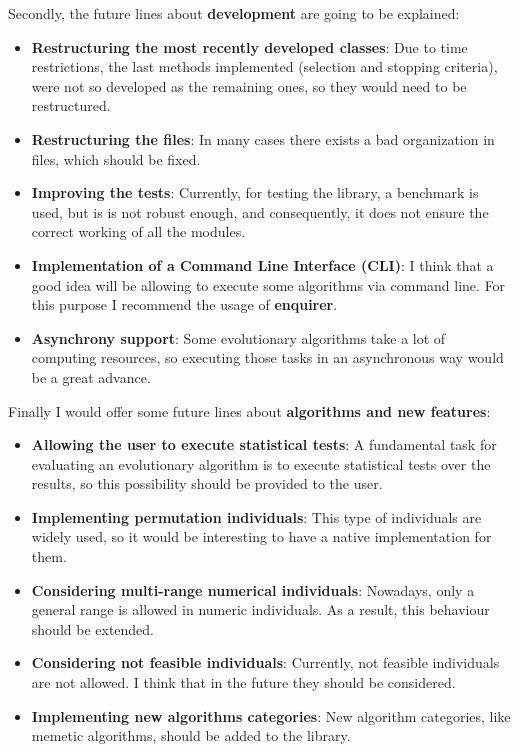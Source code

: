 Secondly, the future lines about \textbf{development} are going to be explained:

\begin{itemize}
    \item \textbf{Restructuring the most recently developed classes}: Due to time restrictions, the last methods implemented (selection and stopping criteria), were not so developed as the remaining ones, so they would need to be restructured.
    \item \textbf{Restructuring the files}: In many cases there exists a bad organization in files, which should be fixed.
    \item \textbf{Improving the tests}: Currently, for testing the library, a benchmark is used, but is is not robust enough, and consequently, it does not ensure the correct working of all the modules.
    \item \textbf{Implementation of a Command Line Interface (CLI)}: I think that a good idea will be allowing to execute some algorithms via command line. For this purpose I recommend the usage of \textbf{enquirer}.
    \item \textbf{Asynchrony support}: Some evolutionary algorithms take a lot of computing resources, so executing those tasks in an asynchronous way would be a great advance.
\end{itemize}

Finally I would offer some future lines about \textbf{algorithms and new features}:

\begin{itemize}
    \item \textbf{Allowing the user to execute statistical tests}: A fundamental task for evaluating an evolutionary algorithm is to execute statistical tests over the results, so this possibility should be provided to the user.
    \item \textbf{Implementing permutation individuals}: This type of individuals are widely used, so it would be interesting to have a native implementation for them.
    \item \textbf{Considering multi-range numerical individuals}: Nowadays, only a general range is allowed in numeric individuals. As a result, this behaviour should be extended.
    \item \textbf{Considering not feasible individuals}: Currently, not feasible individuals are not allowed. I think that in the future they should be considered.
    \item \textbf{Implementing new algorithms categories}: New algorithm categories, like memetic algorithms, should be added to the library.
\end{itemize}
